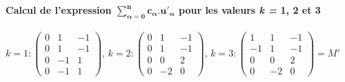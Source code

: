 \documentclass[a4paper, 10pt]{article}
\begin{document}
\textbf{Calcul de l'expression $\mathbf{\sum_{\alpha=0}^n c_{\alpha}.u'_{\alpha}}$ pour les valeurs \textit{k =} 1, 2 et 3}\\ \\
$k = 1 :
\begin{pmatrix}
0 & 1 & -1\\
0 & 1 & -1\\
0 & -1 & 1\\
0 & -1 & 1
\end{pmatrix}$,
$k = 2 :
\begin{pmatrix}
0 & 1 & -1\\
0 & 1 & -1\\
0 & 0 & 2\\
0 & -2 & 0
\end{pmatrix}$,
$k = 3 :
\begin{pmatrix}
1 & 1 & -1\\
-1 & 1 & -1\\
0 & 0 & 2\\
0 & -2 & 0
\end{pmatrix} = M'$\newpage
\end{document}
